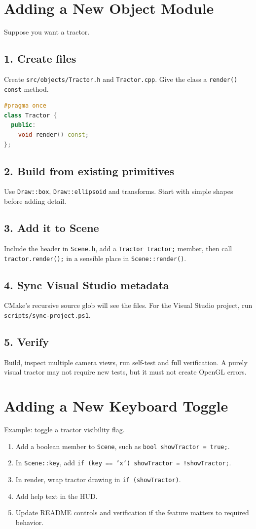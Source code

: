\documentclass[11pt,a4paper,openany]{book}
\newcommand{\code}[1]{\texttt{#1}}
\newcommand{\file}[1]{\nolinkurl{#1}}
\begin{document}
\chapter{Adding a New Object Module}
Suppose you want a tractor.
\section{1. Create files}
Create \file{src/objects/Tractor.h} and \file{Tractor.cpp}. Give the class a \code{render() const} method.

\begin{lstlisting}[language=C++]
#pragma once
class Tractor {
  public:
    void render() const;
};
\end{lstlisting}

\section{2. Build from existing primitives}
Use \code{Draw::box}, \code{Draw::ellipsoid} and transforms. Start with simple shapes before adding detail.

\section{3. Add it to Scene}
Include the header in \file{Scene.h}, add a \code{Tractor tractor;} member, then call \code{tractor.render();} in a sensible place in \code{Scene::render()}.

\section{4. Sync Visual Studio metadata}
CMake's recursive source glob will see the files. For the Visual Studio project, run \file{scripts/sync-project.ps1}.

\section{5. Verify}
Build, inspect multiple camera views, run self-test and full verification. A purely visual tractor may not require new tests, but it must not create OpenGL errors.

\chapter{Adding a New Keyboard Toggle}
Example: toggle a tractor visibility flag.
\begin{enumerate}
	\item Add a boolean member to \code{Scene}, such as \code{bool showTractor = true;}.
	\item In \code{Scene::key}, add \code{if (key == 'x') showTractor = !showTractor;}.
	\item In render, wrap tractor drawing in \code{if (showTractor)}.
	\item Add help text in the HUD.
	\item Update README controls and verification if the feature matters to required behavior.
\end{enumerate}
\end{document}
